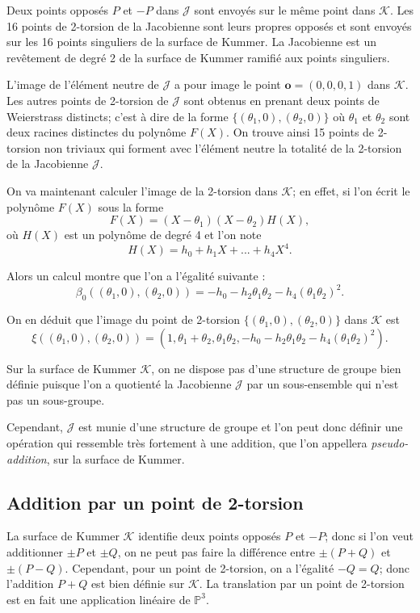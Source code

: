 \documentclass[a4paper,12pt]{article}
\theoremstyle{definition}
\theoremstyle{remark}
\numberwithin{equation}{section}
\begin{document}
Deux points opposés $P$ et $-P$ dans $\mathcal{J}$ sont envoyés sur le même point dans $\mathcal{K}$. Les 16 points de 2-torsion de la Jacobienne sont leurs propres opposés et sont envoyés sur les 16 points singuliers de la surface de Kummer. La Jacobienne est un revêtement de degré 2 de la surface de Kummer ramifié aux points singuliers.

L'image de l'élément neutre de $\mathcal{J}$ a pour image le point $\mathbf{o} = (0,0,0,1)$ dans $\mathcal{K}$. Les autres points de 2-torsion de $\mathcal{J}$ sont obtenus en prenant deux points de Weierstrass distincts; c'est à dire de la forme $\{(\theta_1,0),(\theta_2,0)\}$ où $\theta_1$ et $\theta_2$ sont deux racines distinctes du polynôme $F(X)$. On trouve ainsi 15 points de 2-torsion non triviaux qui forment avec l'élément neutre la totalité de la 2-torsion de la Jacobienne $\mathcal{J}$.

On va maintenant calculer l'image de la 2-torsion dans $\mathcal{K}$; en effet, si l'on écrit le polynôme $F(X)$ sous la forme
$$F(X) = (X-\theta_1)(X-\theta_2)H(X),$$
où $H(X)$ est un polynôme de degré 4 et l'on note
$$H(X) = h_0 + h_1X + ... + h_4X^4.$$

Alors un calcul montre que l'on a l'égalité suivante :
$$\beta_0((\theta_1,0),(\theta_2,0)) = -h_0 -h_2\theta_1\theta_2 - h_4(\theta_1\theta_2)^2.$$

On en déduit que l'image du point de 2-torsion $\{(\theta_1,0),(\theta_2,0)\}$ dans $\mathcal{K}$ est
$$\xi((\theta_1,0),(\theta_2,0)) = (1,\theta_1+\theta_2,\theta_1\theta_2, -h_0 -h_2\theta_1\theta_2 - h_4(\theta_1\theta_2)^2).$$

Sur la surface de Kummer $\mathcal{K}$, on ne dispose pas d'une structure de groupe bien définie puisque l'on a quotienté la Jacobienne $\mathcal{J}$ par un sous-ensemble qui n'est pas un sous-groupe.

Cependant, $\mathcal{J}$ est munie d'une structure de groupe et l'on peut donc définir une opération qui ressemble très fortement à une addition, que l'on appellera \emph{pseudo-addition}, sur la surface de Kummer.

\subsection{Addition par un point de 2-torsion}
\label{add2tors}
La surface de Kummer $\mathcal{K}$ identifie deux points opposés $P$ et $-P$; donc si l'on veut additionner $\pm P$ et $\pm Q$, on ne peut pas faire la différence entre $\pm (P+Q)$ et $\pm (P-Q)$. Cependant, pour un point de 2-torsion, on a l'égalité $-Q=Q$; donc l'addition $P+Q$ est bien définie sur $\mathcal{K}$. La translation par un point de 2-torsion est en fait une application linéaire de $\mathbb{P}^3$.
\end{document}
